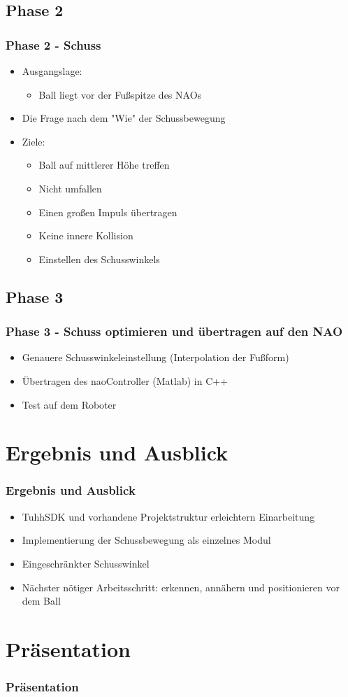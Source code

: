 \documentclass[]{beamer}
\begin{document}
\subsection{Phase 2}
\begin{frame}
	\frametitle{Phase 2 - Schuss}
	\begin{itemize}
		\item Ausgangslage:
		\begin{itemize}
			\item Ball liegt vor der Fußspitze des NAOs
		\end{itemize} 		 
		\item Die Frage nach dem "Wie" der Schussbewegung
		\item Ziele:
		\begin{itemize}
			\item Ball auf mittlerer Höhe treffen
			\item Nicht umfallen
			\item Einen großen Impuls übertragen
			\item Keine innere Kollision
			\item Einstellen des Schusswinkels
		\end{itemize}		 		 
	\end{itemize}
\end{frame}

\subsection{Phase 3}
\begin{frame}
	\frametitle{Phase 3 - Schuss optimieren und übertragen auf den NAO}
	\begin{itemize}
		\item Genauere Schusswinkeleinstellung (Interpolation der Fußform)
		\item Übertragen des naoController (Matlab) in C++
		\item Test auf dem Roboter
	\end{itemize}
\end{frame}

\section{Ergebnis und Ausblick}
\begin{frame}
	\frametitle{Ergebnis und Ausblick}
	\begin{itemize}
		\item TuhhSDK und vorhandene Projektstruktur erleichtern Einarbeitung
		\item Implementierung der Schussbewegung als einzelnes Modul
		\item Eingeschränkter Schusswinkel
		\item Nächster nötiger Arbeitsschritt: erkennen, annähern und positionieren vor dem Ball  
	\end{itemize}
\end{frame}

\section{Präsentation}	
\begin{frame}
	\frametitle{Präsentation}
	
\end{frame}
	
\end{document}
